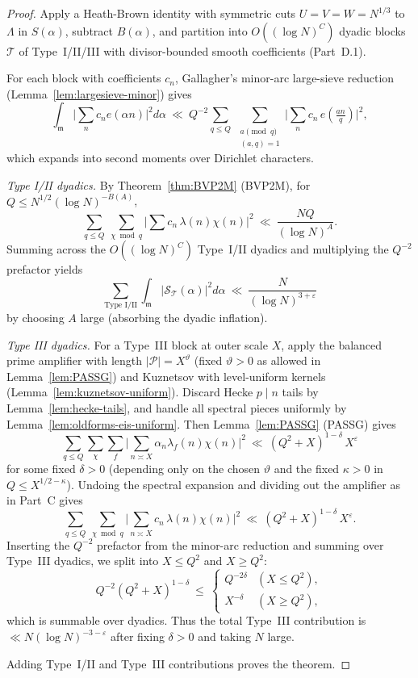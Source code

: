 \documentclass[11pt]{article}
\theoremstyle{definition}
\theoremstyle{remark}
\numberwithin{equation}{part}
\begin{document}
\begin{proof}
	Apply a Heath-Brown identity with symmetric cuts $U=V=W=N^{1/3}$ to $\Lambda$ in $S(\alpha)$, subtract $B(\alpha)$, and partition into $O((\log N)^C)$ dyadic blocks $\mathcal T$ of Type~I/II/III with divisor-bounded smooth coefficients (Part~D.1).

	For each block with coefficients $c_n$, Gallagher's minor-arc large-sieve reduction (Lemma~\ref{lem:largesieve-minor}) gives
	\[
		\int_{\mathfrak m}\Big|\sum_n c_n e(\alpha n)\Big|^2 d\alpha
		\ \ll\ Q^{-2}\!
		\sum_{q\le Q}\ \sum_{\substack{a\!\!\!\pmod q\\ (a,q)=1}}
		\Big|\sum_n c_n\,e\!\left(\tfrac{an}{q}\right)\Big|^2,
	\]
	which expands into second moments over Dirichlet characters.

	\emph{Type I/II dyadics.} By Theorem~\ref{thm:BVP2M} (BVP2M), for $Q\le N^{1/2}(\log N)^{-B(A)}$,
	\[
		\sum_{q\le Q}\ \sum_{\chi\bmod q}\Big|\sum c_n\,\lambda(n)\chi(n)\Big|^2
		\ \ll\ \frac{NQ}{(\log N)^A}.
	\]
	Summing across the $O((\log N)^C)$ Type~I/II dyadics and multiplying the $Q^{-2}$ prefactor yields
	\[
		\sum_{\text{Type I/II}}\int_{\mathfrak m}|\mathcal S_{\mathcal T}(\alpha)|^2 d\alpha
		\ \ll\ \frac{N}{(\log N)^{3+\varepsilon}}
	\]
	by choosing $A$ large (absorbing the dyadic inflation).

	\emph{Type III dyadics.} For a Type~III block at outer scale $X$, apply the balanced prime amplifier with length $|\mathcal P|=X^\vartheta$ (fixed $\vartheta>0$ as allowed in Lemma~\ref{lem:PASSG}) and Kuznetsov with level-uniform kernels (Lemma~\ref{lem:kuznetsov-uniform}).
	Discard Hecke $p\mid n$ tails by Lemma~\ref{lem:hecke-tails}, and handle all spectral pieces uniformly by Lemma~\ref{lem:oldforms-eis-uniform}.
	Then Lemma~\ref{lem:PASSG} (PASSG) gives
	\[
		\sum_{q\le Q}\sum_{\chi}\sum_f
		\Big|\sum_{n\asymp X}\alpha_n\lambda_f(n)\chi(n)\Big|^2
		\ \ll\ (Q^2+X)^{1-\delta}\,X^\varepsilon
	\]
	for some fixed $\delta>0$ (depending only on the chosen $\vartheta$ and the fixed $\kappa>0$ in $Q\le X^{1/2-\kappa}$).
	Undoing the spectral expansion and dividing out the amplifier as in Part~C gives
	\[
		\sum_{q\le Q}\ \sum_{\chi\bmod q}\Big|\sum_{n\asymp X} c_n\,\lambda(n)\chi(n)\Big|^2
		\ \ll\ (Q^2+X)^{1-\delta}\,X^\varepsilon.
	\]
	Inserting the $Q^{-2}$ prefactor from the minor-arc reduction and summing over Type~III dyadics, we split into $X\le Q^2$ and $X\ge Q^2$:
	\[
		Q^{-2}(Q^2+X)^{1-\delta}\ \le\
		\begin{cases}
			Q^{-2\delta} & (X\le Q^2), \\
			X^{-\delta}  & (X\ge Q^2),
		\end{cases}
	\]
	which is summable over dyadics. Thus the total Type~III contribution is $\ll N(\log N)^{-3-\varepsilon}$ after fixing $\delta>0$ and taking $N$ large.

	Adding Type~I/II and Type~III contributions proves the theorem.
\end{proof}
\end{document}
